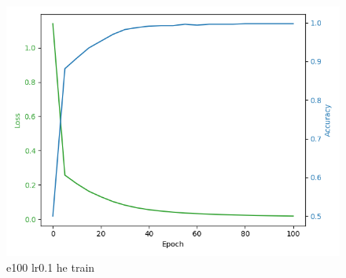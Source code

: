 \documentclass[8pt]{article}
\begin{document}
\begin{figure}[H]
    \begin{minipage}{0.32\textwidth}
        \centering
        \includegraphics[width=\textwidth]{../Prob4/out/1024_173617/e100_lr0.1_btz16_he/training_process.png}
        \caption{e100 lr0.1 he train}
        \label{fig:e100 lr0.1 he train}
    \end{minipage}
\end{figure}
\end{document}
